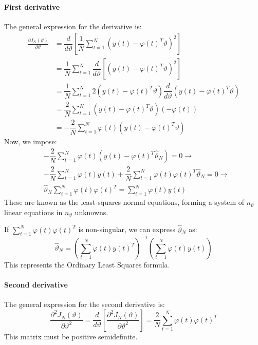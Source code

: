 \paragraph*{First derivative}
The general expression for the derivative is:
\begin{align*}
    \frac{\partial J_N(\vartheta)}{\partial\vartheta}   &=\dfrac{d}{d\vartheta}\left[\dfrac{1}{N}\sum_{t=1}^N\left( y(t)-\varphi(t)^T\vartheta \right)^2\right] \\
                                                        &=\dfrac{1}{N}\sum_{t=1}^N\dfrac{d}{d\vartheta}\left[\left( y(t)-\varphi(t)^T\vartheta \right)^2\right] \\
                                                        &=\dfrac{1}{N}\sum_{t=1}^N 2\left( y(t)-\varphi(t)^T\vartheta \right)\dfrac{d}{d\vartheta}\left( y(t)-\varphi(t)^T\vartheta \right) \\
                                                        &=\dfrac{2}{N}\sum_{t=1}^N \left( y(t)-\varphi(t)^T\vartheta \right)\left(-\varphi(t)\right) \\
                                                        &=-\dfrac{2}{N}\sum_{t=1}^N \varphi(t) \left( y(t)-\varphi(t)^T\vartheta \right)
\end{align*}
Now, we impose:
\begin{align*}
    &-\dfrac{2}{N}\sum_{t=1}^N \varphi(t) \left( y(t)-\varphi(t)^T\hat{\vartheta}_N \right) = 0 \rightarrow \\
    &-\dfrac{2}{N}\sum_{t=1}^N \varphi(t)y(t) + \dfrac{2}{N}\sum_{t=1}^N \varphi(t)\varphi(t)^T\hat{\vartheta}_N = 0 \rightarrow \\ 
    &\hat{\vartheta}_N \sum_{t=1}^N \varphi(t)\varphi(t)^T = \sum_{t=1}^N \varphi(t)y(t)
\end{align*}
These are known as the least-squares normal equations, forming a system of $n_\vartheta$ linear equations in $n_\vartheta$ unknowns.

If $\sum_{t=1}^N \varphi(t)\varphi(t)^T$ is non-singular, we can express $\hat{\vartheta}_N$ as:
\[\hat{\vartheta}_N=\left( \sum_{t=1}^N \varphi(t)y(t)^T \right)^{-1}\left( \sum_{t=1}^N \varphi(t)y(t) \right)\]
This represents the Ordinary Least Squares formula.

\paragraph*{Second derivative}
The general expression for the second derivative is:
\[\frac{\partial^2 J_N(\vartheta)}{\partial\vartheta^2}=\dfrac{d}{d\vartheta}\left[\frac{\partial^2 J_N(\vartheta)}{\partial\vartheta^2}\right]=\dfrac{2}{N}\sum_{t=1} ^{N} \varphi(t)\varphi(t)^T\]
This matrix must be positive semidefinite.


